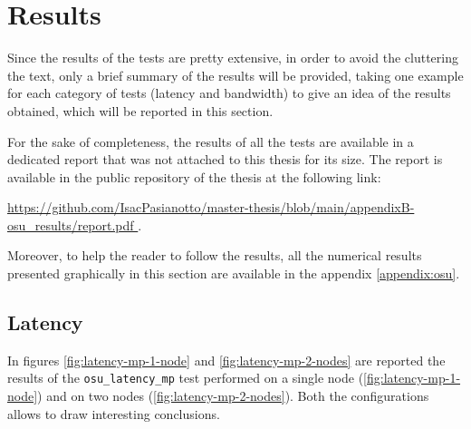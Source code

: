 \section{Results}\label{sec:cniresuls}

Since the results of the tests are pretty extensive, in order to avoid the
cluttering the text, only a brief summary of the results will be provided,
taking one example for each category of tests (latency and bandwidth) to give an
idea of the results obtained, which will be reported in this section.

For the sake of completeness, the results of all the tests are available in a
dedicated report that was not attached to this thesis for its size.
The report is available in the public repository of the thesis at the following link:

\begin{center}
  \small
  \url{
    https://github.com/IsacPasianotto/master-thesis/blob/main/appendixB-osu_results/report.pdf
  }.
\end{center}

Moreover, to help the reader to follow the results, all the numerical results
presented graphically in this section are available in the appendix \ref{appendix:osu}.

\subsection{Latency}\label{subsec:results-latency}

In figures \ref{fig:latency-mp-1-node} and \ref{fig:latency-mp-2-nodes} are reported
the results of the \texttt{osu\_latency\_mp} test performed on a single node
(\ref{fig:latency-mp-1-node}) and on two nodes (\ref{fig:latency-mp-2-nodes}).
Both the configurations allows to draw interesting conclusions.

